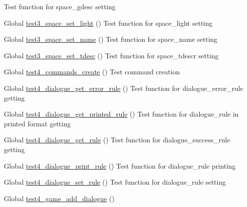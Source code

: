 \begin{DoxyRefList}
%
Test function for space\+\_\+gdesc setting  
\item[Global \mbox{\hyperlink{space__test_8c_a7dda2638dbf06c1c786690c3e54a0c2e}{test3\+\_\+space\+\_\+set\+\_\+light}} ()]\label{test__test000676}%
%
Test function for space\+\_\+light setting  
\item[Global \mbox{\hyperlink{space__test_8c_aa24a337830006e33706ab6ac1c416b47}{test3\+\_\+space\+\_\+set\+\_\+name}} ()]\label{test__test000671}%
%
Test function for space\+\_\+name setting  
\item[Global \mbox{\hyperlink{space__test_8c_af5669e7cab2df3726502c95e6400f7ac}{test3\+\_\+space\+\_\+set\+\_\+tdesc}} ()]\label{test__test000707}%
%
Test function for space\+\_\+tdescr setting  
\item[Global \mbox{\hyperlink{command__test_8c_a5db9324c04ad5c76a85eae5d312a31e7}{test4\+\_\+commands\+\_\+create}} ()]\label{test__test000004}%
%
Test command creation  
\item[Global \mbox{\hyperlink{dialogue__test_8c_ac55253f49f93d76d07cceab5db243ad7}{test4\+\_\+dialogue\+\_\+get\+\_\+error\+\_\+rule}} ()]\label{test__test000050}%
%
Test function for dialogue\+\_\+error\+\_\+rule getting  
\item[Global \mbox{\hyperlink{dialogue__test_8c_a9e6a772d26de16ffb44a813e08403b59}{test4\+\_\+dialogue\+\_\+get\+\_\+printed\+\_\+rule}} ()]\label{test__test000070}%
%
Test function for dialogue\+\_\+rule in printed format getting  
\item[Global \mbox{\hyperlink{dialogue__test_8c_a2cba80c5592bf823bfd8ba5a9bc9a7a1}{test4\+\_\+dialogue\+\_\+get\+\_\+rule}} ()]\label{test__test000046}%
%
Test function for dialogue\+\_\+success\+\_\+rule getting  
\item[Global \mbox{\hyperlink{dialogue__test_8c_a304867110bb20ab2802609d486f8aa02}{test4\+\_\+dialogue\+\_\+print\+\_\+rule}} ()]\label{test__test000060}%
%
Test function for dialogue\+\_\+rule printing  
\item[Global \mbox{\hyperlink{dialogue__test_8c_ade09fcadf2fed54a711fb156188e132c}{test4\+\_\+dialogue\+\_\+set\+\_\+rule}} ()]\label{test__test000036}%
%
Test function for dialogue\+\_\+rule setting  
\item[Global \mbox{\hyperlink{game__test_8c_aedb30005f17db24f2b6d1883f99fac76}{test4\+\_\+game\+\_\+add\+\_\+dialogue}} ()]\label{test__test000293}%

\end{DoxyRefList}
